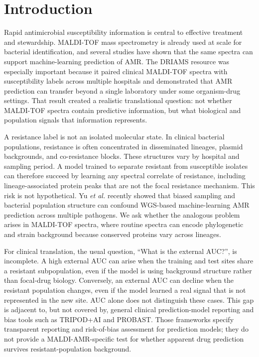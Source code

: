 \documentclass[11pt]{article}
\begin{document}
\section*{Introduction}

Rapid antimicrobial susceptibility information is central to effective treatment and stewardship\cite{murray2022amr}. MALDI-TOF mass spectrometry is already used at scale for bacterial identification\cite{seng2009maldi,patel2015maldi}, and several studies have shown that the same spectra can support machine-learning prediction of AMR\cite{weis2022driams,msdeepamr2024,multilabel2024,saureus2024}. The DRIAMS resource was especially important because it paired clinical MALDI-TOF spectra with susceptibility labels across multiple hospitals and demonstrated that AMR prediction can transfer beyond a single laboratory under some organism-drug settings\cite{weis2022driams,driamsdryad}. That result created a realistic translational question: not whether MALDI-TOF spectra contain predictive information, but what biological and population signals that information represents.

A resistance label is not an isolated molecular state. In clinical bacterial populations, resistance is often concentrated in disseminated lineages, plasmid backgrounds, and co-resistance blocks\cite{canton2011coresistance,pal2015coselection}. These structures vary by hospital and sampling period. A model trained to separate resistant from susceptible isolates can therefore succeed by learning any spectral correlate of resistance, including lineage-associated protein peaks that are not the focal resistance mechanism. This risk is not hypothetical. Yu \textit{et al.} recently showed that biased sampling and bacterial population structure can confound WGS-based machine-learning AMR prediction across multiple pathogens\cite{yu2025population}. We ask whether the analogous problem arises in MALDI-TOF spectra, where routine spectra can encode phylogenetic and strain background because conserved proteins vary across lineages.

For clinical translation, the usual question, ``What is the external AUC?'', is incomplete. A high external AUC can arise when the training and test sites share a resistant subpopulation, even if the model is using background structure rather than focal-drug biology. Conversely, an external AUC can decline when the resistant population changes, even if the model learned a real signal that is not represented in the new site. AUC alone does not distinguish these cases. This gap is adjacent to, but not covered by, general clinical prediction-model reporting and bias tools such as TRIPOD+AI and PROBAST\cite{collins2024tripodai,wolff2019probast}. Those frameworks specify transparent reporting and risk-of-bias assessment for prediction models; they do not provide a MALDI-AMR-specific test for whether apparent drug prediction survives resistant-population background.
\end{document}
